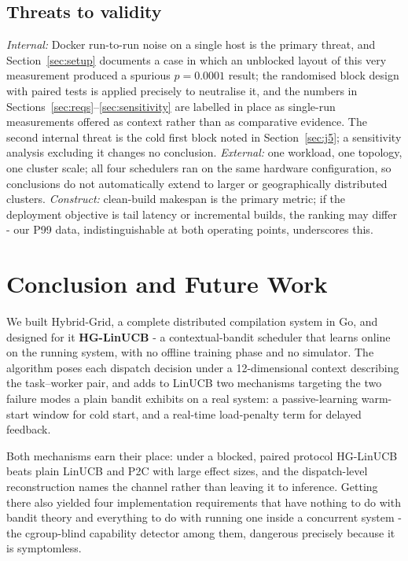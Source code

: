 \documentclass[final,5p,times,twocolumn]{elsarticle}
\begin{document}
\subsection{Threats to validity}

\emph{Internal:} Docker run-to-run noise on a single host is the primary threat, and Section~\ref{sec:setup} documents a case in which an unblocked layout of this very measurement produced a spurious $p=0.0001$ result; the randomised block design with paired tests is applied precisely to neutralise it, and the numbers in Sections~\ref{sec:reqs}--\ref{sec:sensitivity} are labelled in place as single-run measurements offered as context rather than as comparative evidence. The second internal threat is the cold first block noted in Section~\ref{sec:j5}; a sensitivity analysis excluding it changes no conclusion. \emph{External:} one workload, one topology, one cluster scale; all four schedulers ran on the same hardware configuration, so conclusions do not automatically extend to larger or geographically distributed clusters. \emph{Construct:} clean-build makespan is the primary metric; if the deployment objective is tail latency or incremental builds, the ranking may differ - our P99 data, indistinguishable at both operating points, underscores this.

\section{Conclusion and Future Work}
\label{sec:conclusion}

We built Hybrid-Grid, a complete distributed compilation system in Go, and designed for it \textbf{HG-LinUCB} - a contextual-bandit scheduler that learns online on the running system, with no offline training phase and no simulator. The algorithm poses each dispatch decision under a 12-dimensional context describing the task--worker pair, and adds to LinUCB two mechanisms targeting the two failure modes a plain bandit exhibits on a real system: a passive-learning warm-start window for cold start, and a real-time load-penalty term for delayed feedback.

Both mechanisms earn their place: under a blocked, paired protocol HG-LinUCB beats plain LinUCB and P2C with large effect sizes, and the dispatch-level reconstruction names the channel rather than leaving it to inference. Getting there also yielded four implementation requirements that have nothing to do with bandit theory and everything to do with running one inside a concurrent system - the cgroup-blind capability detector among them, dangerous precisely because it is symptomless.
\end{document}
